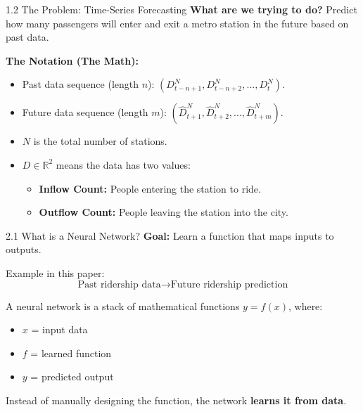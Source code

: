 \documentclass[aspectratio=169]{beamer}
\begin{document}
\begin{frame}{1.2 The Problem: Time-Series Forecasting}
    \textbf{What are we trying to do?}
    Predict how many passengers will enter and exit a metro station in the future based on past data.
    
    \vspace{0.3cm}
    \textbf{The Notation (The Math):}
    \begin{itemize}
        \item Past data sequence (length $n$): $(D_{t-n+1}^{N},D_{t-n+2}^{N},...,D_{t}^{N})$.
        \item Future data sequence (length $m$): $(\hat{D}_{t+1}^{N},\hat{D}_{t+2}^{N},...,\hat{D}_{t+m}^{N})$.
        \item $N$ is the total number of stations.
        \item $D \in \mathbb{R}^{2}$ means the data has two values:
        \begin{itemize}
            \item \textbf{Inflow Count:} People entering the station to ride.
            \item \textbf{Outflow Count:} People leaving the station into the city.
        \end{itemize}
    \end{itemize}
\end{frame}


\begin{frame}{2.1 What is a Neural Network?}
    \textbf{Goal:} Learn a function that maps inputs to outputs.
    
    Example in this paper:
    \[
    \text{Past ridership data} \rightarrow \text{Future ridership prediction}
    \]
    
    A neural network is a stack of mathematical functions $y = f(x)$, where:
    \begin{itemize}
        \item $x$ = input data
        \item $f$ = learned function
        \item $y$ = predicted output
    \end{itemize}
    
    Instead of manually designing the function, the network \textbf{learns it from data}.
\end{frame}
\end{document}
